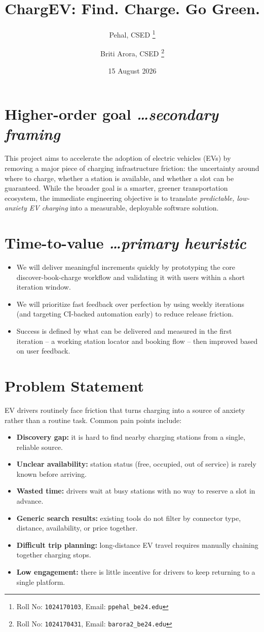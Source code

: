 \documentclass[11pt,a4paper]{article}
\title{ChargEV: Find. Charge. Go Green.}
\author{
  Pehal, CSED%
  \thanks{Roll No: \texttt{1024170103}, %
    Email: \texttt{ppehal\_be24\@thapar.edu}}
  \and 
  Briti Arora, CSED%
  \thanks{Roll No: \texttt{1024170431}, %
    Email: \texttt{barora2\_be24\@thapar.edu}}
}
\date{15 August 2026}
\newcommand{\BvrHint}[1]{%
  {\normalfont\normalsize\itshape\hfill #1}}
\begin{document}
\maketitle

\section{Higher-order goal%
  \BvrHint{\ldots secondary framing}}
This project aims to accelerate the adoption of electric
vehicles (EVs) by removing a major piece of charging
infrastructure friction: the uncertainty around where to
charge, whether a station is available, and whether a slot
can be guaranteed. While the broader goal is a smarter,
greener transportation ecosystem, the immediate engineering
objective is to translate \emph{predictable, low-anxiety EV
charging} into a measurable, deployable software solution.

\section{Time-to-value %
\BvrHint{\ldots primary heuristic}}
\begin{itemize}[leftmargin=0.7cm]
    \item We will deliver meaningful increments quickly by prototyping the core discover-book-charge workflow and validating it with users within a short iteration window.
    \item We will prioritize fast feedback over perfection by using weekly iterations (and targeting CI-backed automation early) to reduce release friction.
    \item Success is defined by what can be delivered and measured in the first iteration -- a working station locator and booking flow -- then improved based on user feedback.
\end{itemize}

\section{Problem Statement}
EV drivers routinely face friction that turns charging into
a source of anxiety rather than a routine task. Common pain
points include:
\begin{itemize}[leftmargin=0.7cm]
    \item \textbf{Discovery gap:} it is hard to find nearby charging stations from a single, reliable source.
    \item \textbf{Unclear availability:} station status (free, occupied, out of service) is rarely known before arriving.
    \item \textbf{Wasted time:} drivers wait at busy stations with no way to reserve a slot in advance.
    \item \textbf{Generic search results:} existing tools do not filter by connector type, distance, availability, or price together.
    \item \textbf{Difficult trip planning:} long-distance EV travel requires manually chaining together charging stops.
    \item \textbf{Low engagement:} there is little incentive for drivers to keep returning to a single platform.
\end{itemize}
\end{document}
